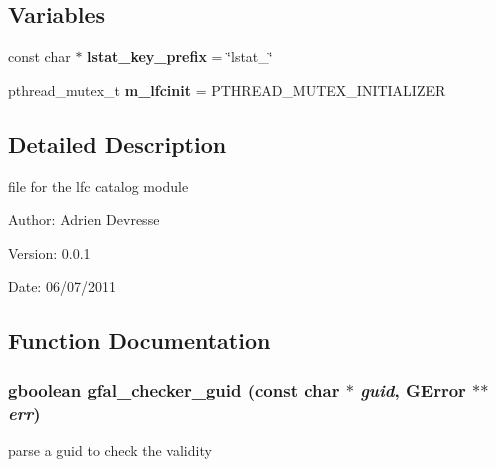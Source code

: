\subsection*{Variables}
\begin{CompactItemize}
\item 
const char $\ast$ \textbf{lstat\_\-key\_\-prefix} = \char`\"{}lstat\_\-\char`\"{}\label{gfal__common__lfc_8c_7b9ab9eba66bd31a32acfacc42a87654}

\item 
pthread\_\-mutex\_\-t \textbf{m\_\-lfcinit} = PTHREAD\_\-MUTEX\_\-INITIALIZER\label{gfal__common__lfc_8c_a683cb37b7f14c7d477e4653816d20df}

\end{CompactItemize}


\subsection{Detailed Description}
file for the lfc catalog module 

\begin{Desc}
\item[Author:]Adrien Devresse \end{Desc}
\begin{Desc}
\item[Version:]0.0.1 \end{Desc}
\begin{Desc}
\item[Date:]06/07/2011 \end{Desc}


\subsection{Function Documentation}
\subsubsection{\setlength{\rightskip}{0pt plus 5cm}gboolean gfal\_\-checker\_\-guid (const char $\ast$ {\em guid}, GError $\ast$$\ast$ {\em err})}\label{gfal__common__lfc_8c_c7f9448e809d5c82f58288d1491dc2d0}


parse a guid to check the validity 
